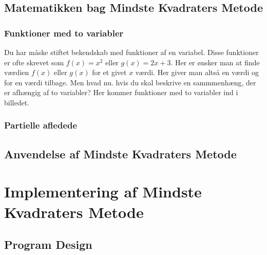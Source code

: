 \subsection{Matematikken bag Mindste Kvadraters Metode}

\subsubsection{Funktioner med to variabler}
Du har måske stiftet bekendskab med funktioner af en variabel. Disse funktioner er ofte skrevet som \begin{math}f(x) = x^2\end{math} eller \begin{math}g(x) = 2x + 3\end{math}. Her er ønsker man at finde værdien $f(x)$ eller $g(x)$ for et givet $x$ værdi. Her giver man altså en værdi og for en værdi tilbage. Men hvad nu. hvis du skal beskrive en sammmenhæng, der er afhængig af to variabler? Her kommer funktioner med to variabler ind i billedet. 

\subsubsection{Partielle afledede}

\subsection{Anvendelse af Mindste Kvadraters Metode}


\section{Implementering af Mindste Kvadraters Metode}


\subsection{Program Design}

